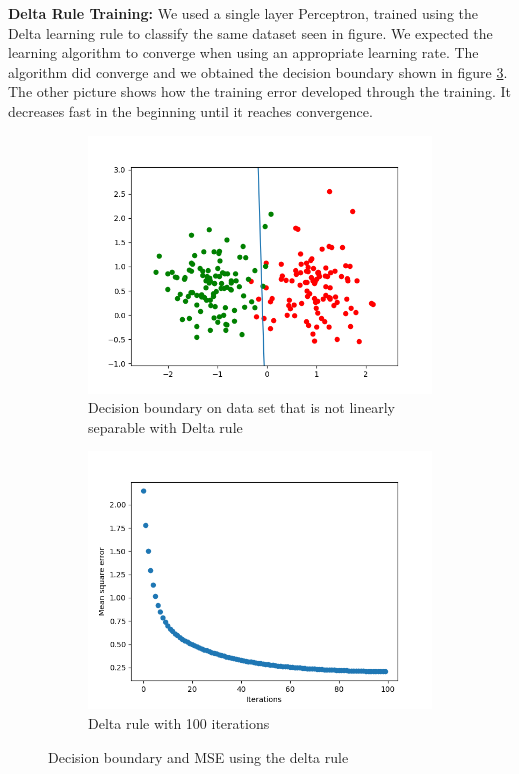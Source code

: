 \documentclass[a4paper]{article}
\begin{document}
\textbf{Delta Rule Training: }We used a single layer Perceptron, trained using the Delta learning rule to classify the same dataset seen in figure. We expected the learning algorithm to converge when using an appropriate learning rate. The algorithm did converge and we obtained the decision boundary shown in figure \ref{fig:6}. The other picture shows how the training error developed through the training. It decreases fast in the beginning until it reaches convergence. 
\begin{figure}[htb]
    \centering
    \begin{subfigure}{0.4\textwidth}
        \includegraphics[width=\textwidth]{Labs/Lab 1/Lab 1a/Results/decicion-boundary-not-separable.png}
        \caption{Decision boundary on data set that is not linearly separable with Delta rule}
        \label{fig:Decision-boundary-not-linearly-separable}
    \end{subfigure}
    \hfill
    \begin{subfigure}{0.4\textwidth}
        \includegraphics[width=\textwidth]{Labs/Lab 1/Lab 1a/Results/error-convergance.png}
        \caption{Delta rule with 100 iterations}
        \label{fig:Error-convergance}
    \end{subfigure}
    \caption{Decision boundary and MSE using the delta rule}
    \label{fig:6}
\end{figure}\\
\end{document}
